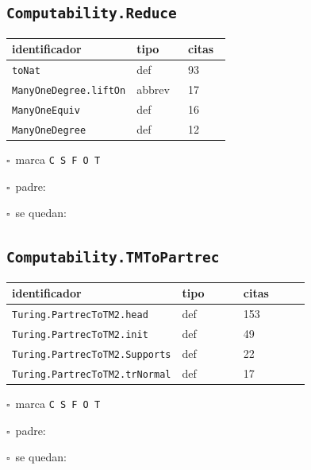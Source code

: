 \documentclass[10pt,a4paper]{article}
\begin{document}
\subsection*{\texttt{Computability.Reduce}}
\noindent\begin{minipage}{0.56\linewidth}\small\begin{tabular}{@{}>{\raggedright\arraybackslash}p{0.58\linewidth}ll@{}}\toprule
identificador & tipo & citas\\\midrule
\texttt{toNat} & def & 93\\
\texttt{ManyOneDegree.\allowbreak{}liftOn} & abbrev & 17\\
\texttt{ManyOneEquiv} & def & 16\\
\texttt{ManyOneDegree} & def & 12\\
\bottomrule\end{tabular}\end{minipage}\hfill\begin{minipage}{0.40\linewidth}\small$\square$~marca \texttt{C S F O T}\par\smallskip$\square$~padre: \dotfill\par\smallskip$\square$~se quedan: \dotfill\par\end{minipage}\par\medskip
\subsection*{\texttt{Computability.TMToPartrec}}
\noindent\begin{minipage}{0.56\linewidth}\small\begin{tabular}{@{}>{\raggedright\arraybackslash}p{0.58\linewidth}ll@{}}\toprule
identificador & tipo & citas\\\midrule
\texttt{Turing.\allowbreak{}PartrecToTM2.\allowbreak{}head} & def & 153\\
\texttt{Turing.\allowbreak{}PartrecToTM2.\allowbreak{}init} & def & 49\\
\texttt{Turing.\allowbreak{}PartrecToTM2.\allowbreak{}Supports} & def & 22\\
\texttt{Turing.\allowbreak{}PartrecToTM2.\allowbreak{}trNormal} & def & 17\\
\bottomrule\end{tabular}\end{minipage}\hfill\begin{minipage}{0.40\linewidth}\small$\square$~marca \texttt{C S F O T}\par\smallskip$\square$~padre: \dotfill\par\smallskip$\square$~se quedan: \dotfill\par\end{minipage}\par\medskip
\end{document}
